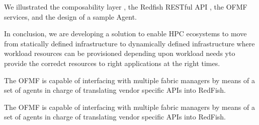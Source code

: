 We illustrated the composability layer {}, the Redfish RESTful API {}, the OFMF services, and the design of a sample Agent. 

In conclusion, we are developing a solution to enable HPC ecosystems to move from statically defined infrastructure to dynamically defined infrastructure where workload resources can be provisioned depending upon workload needs yto provide the corredct resources to right applications at the right times.

The OFMF is capable of interfacing with multiple fabric managers by means of a set of agents in charge of translating vendor specific APIs into RedFish.


The OFMF is capable of interfacing with multiple fabric managers by means of a set of agents in charge of translating vendor specific APIs into RedFish.

